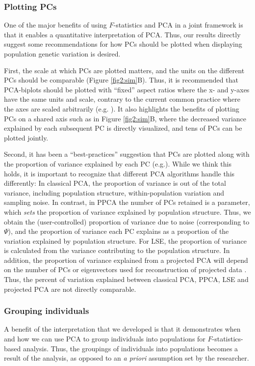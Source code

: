 \documentclass[12pt]{article}
\begin{document}
\subsubsection{Plotting PCs}
One of the major benefits of using $F$-statistics and PCA in a joint framework is that it enables a quantitative interpretation of PCA. Thus, our results directly suggest some recommendations for how PCs should be plotted when displaying population genetic variation is desired. 

First, the scale at which PCs are plotted matters, and the units on the different PCs should be comparable (Figure \ref{fig2:sim}B). Thus, it is recommended that PCA-biplots should be plotted with ``fixed'' aspect ratios where the x- and y-axes have the same units and scale, contrary to the current common practice where the axes are scaled arbitrarily (e.g. \cite{novembre_genes_2008, peter_genetic_2020}). It also highlights the benefits of plotting PCs on a shared axis such as in Figure \ref{fig2:sim}B, where the decreased variance explained by each subsequent PC is directly visualized, and tens of PCs can be plotted jointly.

Second, it has been a ``best-practices'' suggestion that PCs are plotted along with the proportion of variance explained by each PC (e.g.\citep{novembre_recent_2016, elhaik_principal_2022}). While we think this holds, it is important to recognize that different PCA algorithms handle this differently: In classical PCA, the proportion of variance is out of the total variance, including population structure, within-population variation and sampling noise. In contrast, in PPCA the number of PCs retained is a parameter, which \emph{sets} the proportion of variance explained by population structure. Thus, we obtain the (user-controlled) proportion of variance due to noise (corresponding to $\Psi$), and the proportion of variance each PC explains as a proportion of the variation explained by population structure. For LSE, the proportion of variance is calculated from the variance contributing to the population structure. In addition, the proportion of variance explained from a projected PCA will depend on the number of PCs or eigenvectors used for reconstruction of projected data \citep{patterson_population_2006}. 
Thus, the percent of variation explained between classical PCA, PPCA, LSE and projected PCA are not directly comparable.

\subsubsection{Grouping individuals}
A benefit of the interpretation that we developed is that it demonstrates when and how we can use PCA to group individuals into populations for $F$-statistics-based analysis. 
Thus, the groupings of individuals into populations becomes a result of the analysis, as opposed to an \textit{a priori} assumption set by the researcher.
\end{document}
